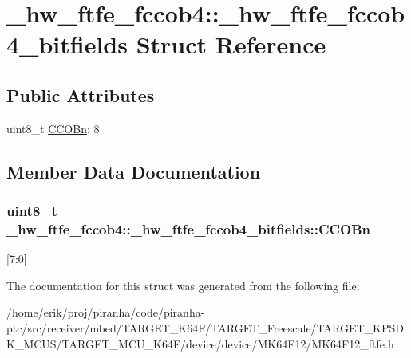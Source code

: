 \hypertarget{struct__hw__ftfe__fccob4_1_1__hw__ftfe__fccob4__bitfields}{}\section{\+\_\+hw\+\_\+ftfe\+\_\+fccob4\+:\+:\+\_\+hw\+\_\+ftfe\+\_\+fccob4\+\_\+bitfields Struct Reference}
\label{struct__hw__ftfe__fccob4_1_1__hw__ftfe__fccob4__bitfields}
\subsection*{Public Attributes}
\begin{DoxyCompactItemize}
\item 
uint8\+\_\+t \hyperlink{struct__hw__ftfe__fccob4_1_1__hw__ftfe__fccob4__bitfields_afb57886444694bcb4969f3fc82231b4c}{C\+C\+O\+Bn}\+: 8
\end{DoxyCompactItemize}


\subsection{Member Data Documentation}
\subsubsection[{\texorpdfstring{C\+C\+O\+Bn}{CCOBn}}]{\setlength{\rightskip}{0pt plus 5cm}uint8\+\_\+t \+\_\+hw\+\_\+ftfe\+\_\+fccob4\+::\+\_\+hw\+\_\+ftfe\+\_\+fccob4\+\_\+bitfields\+::\+C\+C\+O\+Bn}\hypertarget{struct__hw__ftfe__fccob4_1_1__hw__ftfe__fccob4__bitfields_afb57886444694bcb4969f3fc82231b4c}{}\label{struct__hw__ftfe__fccob4_1_1__hw__ftfe__fccob4__bitfields_afb57886444694bcb4969f3fc82231b4c}
\mbox{[}7\+:0\mbox{]} 

The documentation for this struct was generated from the following file\+:\begin{DoxyCompactItemize}
\item 
/home/erik/proj/piranha/code/piranha-\/ptc/src/receiver/mbed/\+T\+A\+R\+G\+E\+T\+\_\+\+K64\+F/\+T\+A\+R\+G\+E\+T\+\_\+\+Freescale/\+T\+A\+R\+G\+E\+T\+\_\+\+K\+P\+S\+D\+K\+\_\+\+M\+C\+U\+S/\+T\+A\+R\+G\+E\+T\+\_\+\+M\+C\+U\+\_\+\+K64\+F/device/device/\+M\+K64\+F12/M\+K64\+F12\+\_\+ftfe.\+h\end{DoxyCompactItemize}
